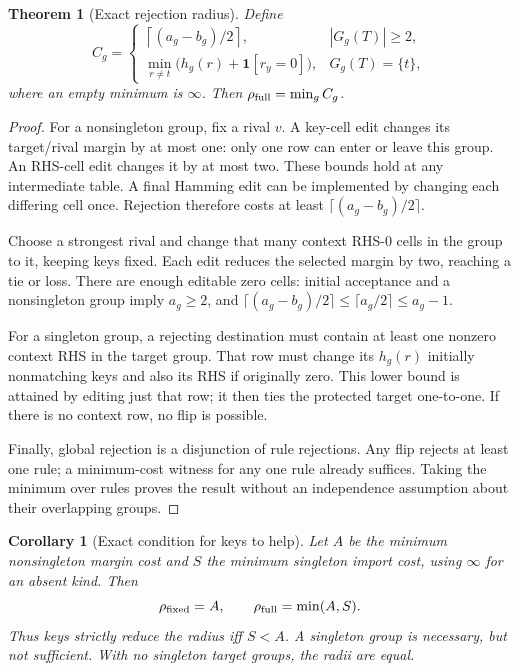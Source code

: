 \documentclass[11pt]{article}
\newtheorem{theorem}{Theorem}
\newtheorem{corollary}{Corollary}
\newcommand{\ind}{\mathbf{1}}
\newcommand{\INF}{\infty}
\begin{document}
\begin{theorem}[Exact rejection radius]\label{thm:reject}
Define
\[
 C_g=\begin{cases}
 \left\lceil(a_g-b_g)/2\right\rceil,& |G_g(T)|\geq2,\\[3pt]
 \displaystyle\min_{r\ne t}\bigl(h_g(r)+\ind[r_y=0]\bigr),&G_g(T)=\{t\},
 \end{cases}
\]
where an empty minimum is $\INF$. Then
$\rho_{\rm full}=\min_g C_g$.
\end{theorem}
\begin{proof}
For a nonsingleton group, fix a rival $v$. A key-cell edit changes its target/rival
margin by at most one: only one row can enter or leave this group. An RHS-cell
edit changes it by at most two. These bounds hold at any intermediate table.
A final Hamming edit can be implemented by changing each differing cell once.
Rejection therefore costs at least $\lceil(a_g-b_g)/2\rceil$.

Choose a strongest rival and change that many context RHS-0 cells in the group
to it, keeping keys fixed. Each edit reduces the selected margin by two, reaching
a tie or loss. There are enough editable zero cells: initial acceptance and a
nonsingleton group imply $a_g\geq2$, and
$\lceil(a_g-b_g)/2\rceil\leq\lceil a_g/2\rceil\leq a_g-1$.

For a singleton group, a rejecting destination must contain at least one
nonzero context RHS in the target group. That row must change its $h_g(r)$
initially nonmatching keys and also its RHS if originally zero. This lower
bound is attained by editing just that row; it then ties the protected target
one-to-one. If there is no context row, no flip is possible.

Finally, global rejection is a disjunction of rule rejections. Any flip rejects
at least one rule; a minimum-cost witness for any one rule already suffices.
Taking the minimum over rules proves the result without an independence
assumption about their overlapping groups.
\end{proof}

\begin{corollary}[Exact condition for keys to help]\label{cor:singleton}
Let $A$ be the minimum nonsingleton margin cost and $S$ the minimum singleton
import cost, using $\INF$ for an absent kind. Then
\[
 \rho_{\rm fixed}=A,\qquad \rho_{\rm full}=\min(A,S).
\]
Thus keys strictly reduce the radius iff $S<A$. A singleton group is necessary,
but not sufficient. With no singleton target groups, the radii are equal.
\end{corollary}
\end{document}
